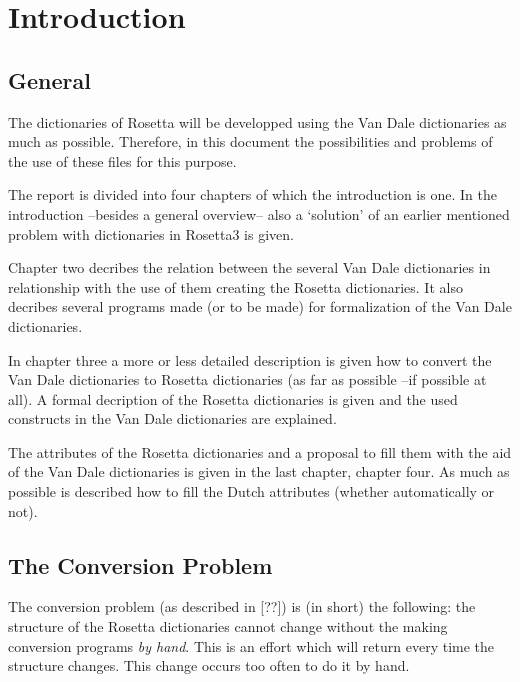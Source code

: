 
   \RosDate{\today}
   \RosSupersedes{-}
   \MakeRosTitle
%
%
\setlength{\parskip}{2mm}
\setlength{\parindent}{0mm}

\section{Introduction}

\subsection{General}

The dictionaries of Rosetta will be developped using the Van Dale dictionaries 
as much as possible. Therefore, in this document the possibilities and problems 
of the use of these files for this purpose. 

The report is divided into four chapters of which the introduction is one.
In the introduction --besides a general overview-- also a `solution' of an 
earlier mentioned problem with dictionaries in Rosetta3 is given.

Chapter two decribes the relation between the several Van Dale dictionaries
in relationship with the use of them creating the Rosetta dictionaries. It also
decribes several programs made (or to be made) for formalization of the Van 
Dale dictionaries.

In chapter three a more or less detailed description is given how to convert 
the Van Dale dictionaries to Rosetta dictionaries (as far as possible --if
possible at all). A formal decription of the Rosetta dictionaries is given and 
the used constructs in the Van Dale dictionaries are explained.

The attributes of the Rosetta dictionaries and a proposal to fill them with the 
aid of the Van Dale dictionaries is given in the last chapter, chapter four. As
much as possible is described how to fill the Dutch attributes (whether 
automatically or not).

\subsection{The Conversion Problem}

The conversion problem (as described in [??]) is (in short) the following:
the structure of the Rosetta dictionaries cannot change without the making 
conversion programs {\em by hand}. This is an effort which will return every 
time the structure changes. This change occurs too often to do it by hand.

